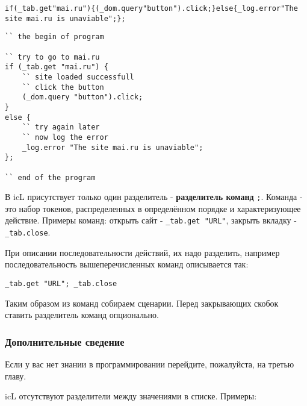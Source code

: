 \documentclass[a4paper, 14pt]{extarticle}
\begin{document}
\begin{lstlisting}[caption=Koд без пробельных символов,label=unreadable]
if(_tab.get"mai.ru"){(_dom.query"button").click;}else{_log.error"The site mai.ru is unaviable";};
\end{lstlisting}

\begin{lstlisting}[caption=Koд с пробельных символов,label=readable]
`` the begin of program

`` try to go to mai.ru
if (_tab.get "mai.ru") {
	`` site loaded successfull
	`` click the button
	(_dom.query "button").click;
}
else {
	`` try again later
	`` now log the error
	_log.error "The site mai.ru is unaviable";
};

`` end of the program
\end{lstlisting}

В icL присутствует только один разделитель - \textbf{разделитель команд} \lstinline`;`. Команда - это набор токенов, распределенных в определённом порядке и характеризующее действие. Примеры команд: открыть сайт - \lstinline`_tab.get "URL"`, закрыть вкладку - \lstinline`_tab.close`.

При описании последовательности действий, их надо разделить, например последовательность вышеперечисленных команд описывается так:

\begin{lstlisting}[numbers=none]
_tab.get "URL"; _tab.close
\end{lstlisting}

Таким образом из команд собираем сценарии. Перед закрывающих скобок ставить разделитель команд опционально.

\subsubsection{Дополнительные сведение}

Если у вас нет знании в программировании перейдите, пожалуйста, на третью главу.

icL отсутствуют разделители между значениями в списке. Примеры:
\end{document}
